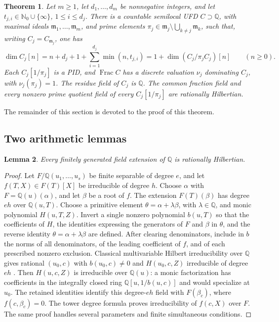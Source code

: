 \documentclass[11pt,reqno]{amsart}
\numberwithin{equation}{section}
\theoremstyle{plain}
\newtheorem{theorem}{Theorem}[section]
\newtheorem{lemma}[theorem]{Lemma}
\theoremstyle{definition}
\theoremstyle{remark}
\begin{document}
\begin{theorem}\label{thm:ordinary}
Let \(m\ge1\), let \(d_1,\ldots,d_m\) be nonnegative integers, and let
\(t_{j,i}\in\mathbb N_0\cup\{\infty\}\), \(1\le i\le d_j\).
There is a countable semilocal UFD \(C\supset\mathbb Q\), with maximal
ideals \(\mathfrak m_1,\ldots,\mathfrak m_m\), and prime elements
\(\pi_j\in\mathfrak m_j\setminus\bigcup_{k\ne j}\mathfrak m_k\), such that,
writing \(C_j=C_{\mathfrak m_j}\), one has
\begin{equation}\label{eq:ordinary-realization}
 \dim C_j[n]=n+d_j+1+\sum_{i=1}^{d_j}\min(n,t_{j,i})
            =1+\dim(C_j/\pi_jC_j)[n]\qquad(n\ge0).
\end{equation}
Each \(C_j[1/\pi_j]\) is a PID, and \(\operatorname{Frac}C\) has a
discrete valuation \(\nu_j\) dominating \(C_j\), with
\(\nu_j(\pi_j)=1\). The residue field of \(C_j\) is \(\mathbb Q\).
The common fraction field and every nonzero prime quotient field of
every \(C_j[1/\pi_j]\) are rationally Hilbertian.
\end{theorem}
The remainder of this section is devoted to the proof of this theorem.


\subsection{Two arithmetic lemmas}

\begin{lemma}\label{lem:ordinary-rational-hilbert}
Every finitely generated field extension of \(\mathbb Q\) is
rationally Hilbertian.
\end{lemma}
\begin{proof}
Let \(F/\mathbb Q(u_1,\ldots,u_s)\) be finite separable of degree \(e\),
and let \(f(T,X)\in F(T)[X]\) be irreducible of degree \(h\).
Choose \(\alpha\) with \(F=\mathbb Q(u)(\alpha)\), and let
\(\beta\) be a root of \(f\). The extension \(F(T)(\beta)\)
has degree \(eh\) over \(\mathbb Q(u,T)\). Choose a primitive
element \(\theta=\alpha+\lambda\beta\), with \(\lambda\in\mathbb Q\),
and monic polynomial \(H(u,T,Z)\). Invert a single nonzero
polynomial \(b(u,T)\) so that
the coefficients of \(H\), the identities expressing the generators
of \(F\) and \(\beta\) in \(\theta\), and the reverse identity
\(\theta=\alpha+\lambda\beta\) are defined. After clearing
denominators, include in \(b\) the norms of all denominators,
of the leading coefficient of \(f\), and of each prescribed
nonzero exclusion. Classical multivariable Hilbert irreducibility
over \(\mathbb Q\) gives rational \((u_0,c)\) with \(b(u_0,c)\ne0\)
and \(H(u_0,c,Z)\) irreducible of degree \(eh\)
\cite{Iadarola2021}.
Then \(H(u,c,Z)\) is irreducible over \(\mathbb Q(u)\): a monic
factorization has coefficients in the integrally closed ring
\(\mathbb Q[u,1/b(u,c)]\) and would specialize at \(u_0\).
The retained identities identify this degree-\(eh\) field with
\(F(\beta_c)\), where \(f(c,\beta_c)=0\). The tower degree
formula proves irreducibility
of \(f(c,X)\) over \(F\). The same proof handles several parameters
and finite simultaneous conditions.
\end{proof}
\end{document}
